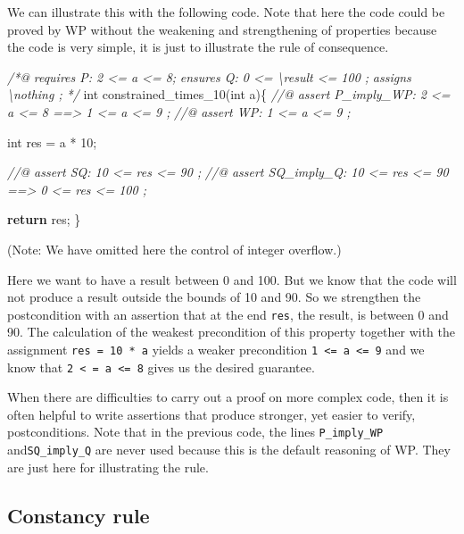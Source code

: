 \documentclass[12pt,francais,]{scrbook}
\newenvironment{Shaded}{}{}
\newcommand{\KeywordTok}[1]{\textcolor[rgb]{0.00,0.44,0.13}{\textbf{{#1}}}}
\newcommand{\DataTypeTok}[1]{\textcolor[rgb]{0.56,0.13,0.00}{{#1}}}
\newcommand{\DecValTok}[1]{\textcolor[rgb]{0.25,0.63,0.44}{{#1}}}
\newcommand{\CommentTok}[1]{\textcolor[rgb]{0.38,0.63,0.69}{\textit{{#1}}}}
\newcommand{\NormalTok}[1]{{#1}}
\begin{document}
We can illustrate this with the following code. Note that here the code
could be proved by WP without the weakening and strengthening of
properties because the code is very simple, it is just to illustrate the
rule of consequence.

\clearpage

\begin{footnotesize}\begin{Shaded}
\begin{Highlighting}[]
\CommentTok{/*@}
\CommentTok{  requires P: 2 <= a <= 8;}
\CommentTok{  ensures  Q: 0 <= \textbackslash{}result <= 100 ;}
\CommentTok{  assigns  \textbackslash{}nothing ;}
\CommentTok{*/}
\DataTypeTok{int} \NormalTok{constrained_times_10(}\DataTypeTok{int} \NormalTok{a)\{}
  \CommentTok{//@ assert P_imply_WP: 2 <= a <= 8 ==> 1 <= a <= 9 ;}
  \CommentTok{//@ assert WP:         1 <= a <= 9 ;}

  \DataTypeTok{int} \NormalTok{res = a * }\DecValTok{10}\NormalTok{;}

  \CommentTok{//@ assert SQ:         10 <= res <= 90 ;}
  \CommentTok{//@ assert SQ_imply_Q: 10 <= res <= 90 ==> 0 <= res <= 100 ;}

  \KeywordTok{return} \NormalTok{res;}
\NormalTok{\}}
\end{Highlighting}
\end{Shaded}\end{footnotesize}

(Note: We have omitted here the control of integer overflow.)

Here we want to have a result between 0 and 100. But we know that the
code will not produce a result outside the bounds of 10 and 90. So we
strengthen the postcondition with an assertion that at the end
\texttt{res}, the result, is between 0 and 90. The calculation of the
weakest precondition of this property together with the assignment
\texttt{res\ =\ 10\ *\ a} yields a weaker precondition
\texttt{1\ \textless{}=\ a\ \textless{}=\ 9} and we know that
\texttt{2\ \textless{}\ =\ a\ \textless{}=\ 8} gives us the desired
guarantee.

When there are difficulties to carry out a proof on more complex code,
then it is often helpful to write assertions that produce stronger, yet
easier to verify, postconditions. Note that in the previous code, the
lines \texttt{P\_imply\_WP} and\texttt{SQ\_imply\_Q} are never used
because this is the default reasoning of WP. They are just here for
illustrating the rule.

\subsection{Constancy rule}\label{constancy-rule}
\end{document}
